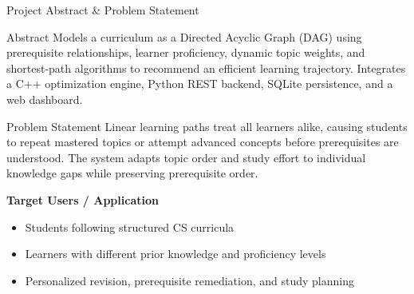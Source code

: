 \documentclass[aspectratio=169,11pt]{beamer}
\begin{document}
\begin{frame}{Project Abstract \& Problem Statement}
\footnotesize
\setlength{\parskip}{1pt}

\begin{block}{Abstract}
Models a curriculum as a Directed Acyclic Graph (DAG) using prerequisite relationships, learner proficiency, dynamic topic weights, and shortest-path algorithms to recommend an efficient learning trajectory. Integrates a C++ optimization engine, Python REST backend, SQLite persistence, and a web dashboard.
\end{block}
\vspace{-1.5mm}
\begin{block}{Problem Statement}
Linear learning paths treat all learners alike, causing students to repeat mastered topics or attempt advanced concepts before prerequisites are understood. The system adapts topic order and study effort to individual knowledge gaps while preserving prerequisite order.
\end{block}
\vspace{-1mm}
{\bfseries\color{GEUBlue}Target Users / Application}
\begin{itemize}\itemsep0.5pt\parskip0pt
\item Students following structured CS curricula
\item Learners with different prior knowledge and proficiency levels
\item Personalized revision, prerequisite remediation, and study planning
\end{itemize}
\end{frame}
\end{document}
